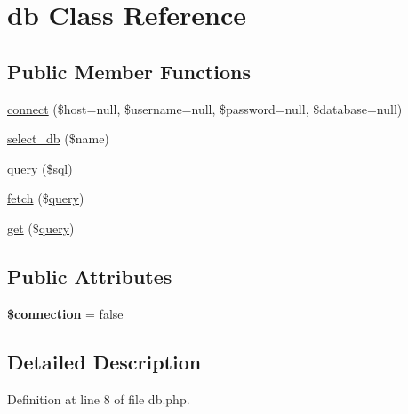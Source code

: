 \hypertarget{classdb}{\section{db Class Reference}
\label{classdb}
}
\subsection*{Public Member Functions}
\begin{DoxyCompactItemize}
\item 
\hyperlink{classdb_aa53805c5899dbfcac4625ab0e2820f26}{connect} (\$host=null, \$username=null, \$password=null, \$database=null)
\item 
\hyperlink{classdb_afff76d795eed804416c22a05edee728a}{select\-\_\-db} (\$name)
\item 
\hyperlink{classdb_abd50f30bb594fed70607832460a9f03a}{query} (\$sql)
\item 
\hyperlink{classdb_a6cd321cd157312e66de11c242d27d268}{fetch} (\$\hyperlink{classdb_abd50f30bb594fed70607832460a9f03a}{query})
\item 
\hyperlink{classdb_a4c8cb845fd6b4d2784424e2026d3a6cb}{get} (\$\hyperlink{classdb_abd50f30bb594fed70607832460a9f03a}{query})
\end{DoxyCompactItemize}
\subsection*{Public Attributes}
\begin{DoxyCompactItemize}
\item 
\hypertarget{classdb_afda49e13c635218bb190bcf61c82797d}{{\bfseries \$connection} = false}\label{classdb_afda49e13c635218bb190bcf61c82797d}

\end{DoxyCompactItemize}


\subsection{Detailed Description}


Definition at line 8 of file db.\-php.



